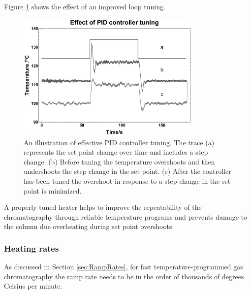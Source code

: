 Figure \ref{fig:LoopTuning} shows the effect of an improved loop tuning. 

\begin{figure}
	\centering
	\includegraphics[width=0.8\textwidth]{Figures/LoopTuningGraph.pdf}
	\decoRule	
	\caption[Effect of controller tuning]{An illustration of effective PID
	controller tuning. The trace (a) represents the set point change over time and
	includes a step change. (b) Before tuning the temperature overshoots and then
	undershoots the step change in the set point. (c) After the controller has been
	tuned the overshoot in response to a step change in the set point is minimized. }
	\label{fig:LoopTuning} 
\end{figure}

A properly tuned heater helps to improve the repeatability of the chromatography
through reliable temperature programs and prevents damage to the column due
overheating during set point overshoots.

\subsubsection{Heating rates}

As discussed in Section \ref{sec:RampRates}, for fast temperature-programmed gas
chromatography the ramp rate needs to be in the order of thousands of degrees
Celsius per minute.

